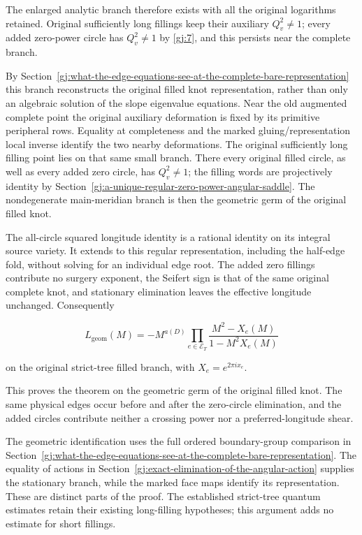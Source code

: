 The enlarged analytic branch therefore exists with all the original
logarithms retained. Original sufficiently long fillings keep their
auxiliary \(Q_v^2\ne1\); every added zero-power circle has
\(Q_v^2\ne1\) by \eqref{gj:7}, and this persists near the complete branch.

By Section~\ref{gj:what-the-edge-equations-see-at-the-complete-bare-representation} this branch reconstructs the original filled knot representation, rather than only an algebraic solution of the slope eigenvalue equations. Near the old augmented complete point the original auxiliary deformation is fixed by its primitive peripheral rows. Equality at completeness and the marked gluing/representation local inverse identify the two nearby deformations. The original sufficiently long filling point lies on that same small branch. There every original filled circle, as well as every added zero circle, has \(Q_v^2\ne1\); the filling words are projectively identity by Section~\ref{gj:a-unique-regular-zero-power-angular-saddle}. The nondegenerate main-meridian branch is then the geometric germ of the original filled knot.

The all-circle squared longitude identity is a rational identity on its integral source variety. It extends to this regular representation, including the half-edge fold, without solving for an individual edge root. The added zero fillings contribute no surgery exponent, the Seifert sign is that of the same original complete knot, and stationary elimination leaves the effective longitude unchanged. Consequently

\begin{equation}\label{gj:24}
L_{\mathrm{geom}}(M)
   =-M^{a(D)}
      \prod_{e\in\mathcal E_T}
                \frac{M^2-X_e(M)}{1-M^2X_e(M)}
\end{equation}

on the original strict-tree filled branch, with \(X_e=e^{2\pi ix_e}\).

This proves the theorem on the geometric germ of the original
filled knot. The same physical edges occur before and after the
zero-circle elimination, and the added circles contribute neither
a crossing power nor a preferred-longitude shear.

The geometric identification uses the full ordered boundary-group
comparison in Section~\ref{gj:what-the-edge-equations-see-at-the-complete-bare-representation}. The equality of actions in Section~\ref{gj:exact-elimination-of-the-angular-action} supplies
the stationary branch, while the marked face maps identify its
representation. These are distinct parts of the proof. The established
strict-tree quantum estimates retain their existing long-filling
hypotheses; this argument adds no estimate for short fillings.

